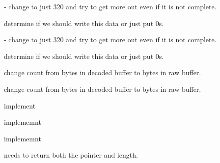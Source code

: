 
\begin{DoxyRefList}
\item[\label{todo__todo000003}%
\hypertarget{todo__todo000003}{}%
global\+Scope$>$ Global \hyperlink{disk__util_8h_ab8a7dd8f773ae75ecfca3828e48c0308}{align\+Sector} (B\+Y\+T\+E $\ast$out, B\+Y\+T\+E $\ast$in, W\+O\+R\+D length, B\+Y\+T\+E sync\+Byte=Prefix\+Sync\+Char\+\_\+c)]-\/ change to just 320 and try to get more out even if it is not complete. 

determine if we should write this data or just put 0s.  
\item[\label{todo__todo000003}%
\hypertarget{todo__todo000003}{}%
global\+Scope$>$ Global \hyperlink{disk__util_8h_ab8a7dd8f773ae75ecfca3828e48c0308}{align\+Sector} (B\+Y\+T\+E $\ast$out, B\+Y\+T\+E $\ast$in, W\+O\+R\+D length, B\+Y\+T\+E sync\+Byte=Prefix\+Sync\+Char\+\_\+c)]-\/ change to just 320 and try to get more out even if it is not complete. 

determine if we should write this data or just put 0s.  
\item[\label{todo__todo000001}%
\hypertarget{todo__todo000001}{}%
Global \hyperlink{classDecode_a287c55f9f9888c433d950c08254c1efe}{Decode\+:\+:decode\+F\+M} (B\+Y\+T\+E $\ast$decoded, B\+Y\+T\+E $\ast$fm\+Encoded, unsigned int count)]change count from bytes in decoded buffer to bytes in raw buffer.  
\item[\label{todo__todo000002}%
\hypertarget{todo__todo000002}{}%
Global \hyperlink{classDecode_ab154f17b196d8d2f3681756300da2f30}{Decode\+:\+:decode\+M\+F\+M} (B\+Y\+T\+E $\ast$decoded, B\+Y\+T\+E $\ast$fm\+Encoded, unsigned int count)]change count from bytes in decoded buffer to bytes in raw buffer. 

implement  
\item[\label{todo__todo000012}%
\hypertarget{todo__todo000012}{}%
Global \hyperlink{classH17Disk_a498d909fe673835841cb862efc9d2589}{H17\+Disk\+:\+:add\+Raw\+Sector\+To\+Data\+Block} (uint8\+\_\+t side, uint8\+\_\+t track, uint8\+\_\+t sector, uint8\+\_\+t $\ast$buf, uint16\+\_\+t length)]implememnt  
\item[\label{todo__todo000011}%
\hypertarget{todo__todo000011}{}%
Global \hyperlink{classH17Disk_a49978c35eab8155da4475519bf5e6e78}{H17\+Disk\+:\+:add\+Sector\+To\+Data\+Block} (uint8\+\_\+t side, uint8\+\_\+t track, uint8\+\_\+t sector, uint8\+\_\+t $\ast$buf, uint16\+\_\+t length)]implememnt  
\item[\label{todo__todo000013}%
\hypertarget{todo__todo000013}{}%
Global \hyperlink{classH17Disk_a0c6e6f10c3dceff61a31827a25e32043}{H17\+Disk\+:\+:get\+Sector\+Data} (unsigned char side, unsigned char track, unsigned char sector)]needs to return both the pointer and length. 


\end{DoxyRefList}
